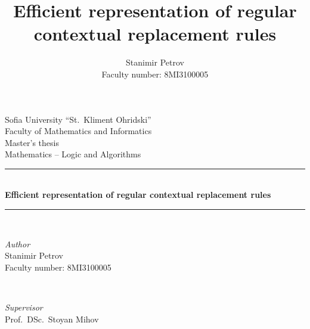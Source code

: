 \documentclass{article}
\author{
	Stanimir Petrov\\
	Faculty number: 8MI3100005
}
\title{Efficient representation of regular contextual replacement rules}
\date{\DTMnow}
\begin{document}
	\begin{titlepage} %
		\newcommand{\HRule}{\rule{\linewidth}{0.5mm}} %
		\centering %
		{
			\LARGE Sofia University ``St.\ Kliment Ohridski'' \\
			Faculty of Mathematics and Informatics
		} \\
		[1.5cm]
		{\Large Master's thesis} \\
		[0.5cm]
		{\large Mathematics -- Logic and Algorithms} \\
		[0.5cm]
		
		\HRule\\[0.4cm]
		{\huge\bfseries Efficient representation of regular contextual replacement rules}\\[0.4cm]
		\HRule\\[1.5cm]
		
		\begin{minipage}{0.48\textwidth}
			\begin{flushleft}
				\large
				\textit{Author} \\
				Stanimir Petrov \\
				Faculty number: 8MI3100005
			\end{flushleft}
		\end{minipage}
		~
		\begin{minipage}{0.48\textwidth}
			\begin{flushright}
				\large
				\textit{Supervisor}\\
				Prof.\ DSc.\ Stoyan Mihov
			\end{flushright}
		\end{minipage}
		
		\vfill\vfill\vfill %
		{\large\DTMnow}
		
		\vfill %
	\end{titlepage}
\end{document}
